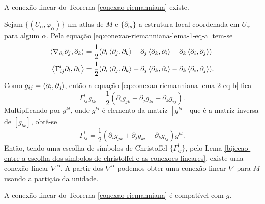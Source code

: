 \begin{lema}\label{conexao-riemanniana-lema-2}
	A conexão linear do Teorema \ref{conexao-riemanniana} existe.
\end{lema}

\begin{demonstracao}
	Sejam
	$\{ (U_{\alpha}, \varphi_{\alpha}) \}$ um atlas de $M$ e
	$\{ \partial_m \}$ a estrutura local coordenada em $U_{\alpha}$ para algum $\alpha$.
	Pela equação \eqref{eq:conexao-riemanniana-lema-1-eq-a} tem-se
	\begin{equation}\label{eq:conexao-riemanniana-lema-2-eq-b}
		\begin{split}
			\left\langle \nabla_{\partial_i} \partial_j,\partial_k \right\rangle &= \frac{1}{2} (\partial_i \left\langle \partial_j,\partial_k \right\rangle + \partial_j \left\langle \partial_k,\partial_i \right\rangle - \partial_k \left\langle \partial_i,\partial_j \right\rangle)\\
			\left\langle \Gamma_{ij}^l \partial_l,\partial_k \right\rangle &= \frac{1}{2} (\partial_i \left\langle \partial_j,\partial_k \right\rangle + \partial_j \left\langle \partial_k,\partial_i \right\rangle - \partial_k \left\langle \partial_i,\partial_j \right\rangle).		
		\end{split}		
	\end{equation}
	Como $g_{ij} = \left\langle \partial_i,\partial_j \right\rangle$, então a equação \eqref{eq:conexao-riemanniana-lema-2-eq-b} fica
	\begin{equation}\label{eq:conexao-riemanniana-lema-2-eq-a}
		\Gamma_{ij}^l g_{lk} = \frac{1}{2} (\partial_i g_{jk} + \partial_j g_{ki} - \partial_k g_{ij}).
	\end{equation}
	Multiplicando por $g^{kl}$, onde $g^{kl}$ é elemento da matriz $[g^{kl}]$ que é a matriz inversa de $[g_{lk}]$, obtê-se
	\begin{equation*}
		\Gamma_{ij}^l = \frac{1}{2} (\partial_i g_{jk} + \partial_j g_{ki} - \partial_k g_{ij}) g^{kl}.
	\end{equation*}
	Então, tendo uma escolha de símbolos de Christoffel $\{ \Gamma_{ij}^l \}$, pelo Lema \ref{bijecao-entre-a-escolha-dos-simbolos-de-christoffel-e-as-conexoes-lineares}, existe uma conexão linear $\nabla^{\alpha}$.
	A partir dos $\nabla^{\alpha}$ podemos obter uma conexão linear $\nabla$ para $M$ usando a partição da unidade.
\end{demonstracao}

\begin{lema}\label{conexao-riemanniana-lema-3}
	A conexão linear do Teorema \ref{conexao-riemanniana} é compatível com $g$.
\end{lema}

